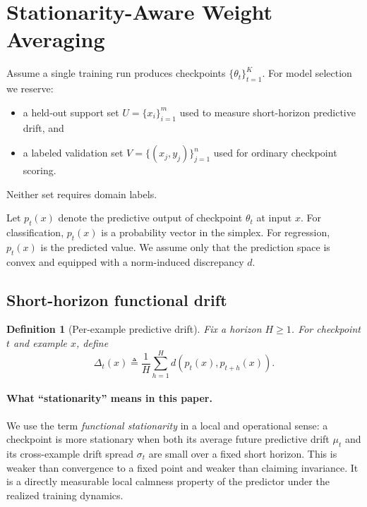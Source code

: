 \documentclass{article}
\newtheorem{definition}{Definition}
\begin{document}
\section{Stationarity-Aware Weight Averaging}
\label{sec:method}

Assume a single training run produces checkpoints $\{\theta_t\}_{t=1}^{K}$. For model selection we reserve:
\begin{itemize}[leftmargin=1.4em]
    \item a held-out support set $U = \{x_i\}_{i=1}^{m}$ used to measure short-horizon predictive drift, and
    \item a labeled validation set $V = \{(x_j,y_j)\}_{j=1}^{n}$ used for ordinary checkpoint scoring.
\end{itemize}
Neither set requires domain labels.

Let $p_t(x)$ denote the predictive output of checkpoint $\theta_t$ at input $x$. For classification, $p_t(x)$ is a probability vector in the simplex. For regression, $p_t(x)$ is the predicted value. We assume only that the prediction space is convex and equipped with a norm-induced discrepancy $d$.

\subsection{Short-horizon functional drift}

\begin{definition}[Per-example predictive drift]
Fix a horizon $H \ge 1$. For checkpoint $t$ and example $x$, define
\begin{equation}
    \Delta_t(x)
    \triangleq
    \frac{1}{H}\sum_{h=1}^{H} d\!\left(p_t(x), p_{t+h}(x)\right).
    \label{eq:delta}
\end{equation}
\end{definition}

\paragraph{What ``stationarity'' means in this paper.}
We use the term \emph{functional stationarity} in a local and operational sense: a checkpoint is more stationary when both its average future predictive drift $\mu_t$ and its cross-example drift spread $\sigma_t$ are small over a fixed short horizon. This is weaker than convergence to a fixed point and weaker than claiming invariance. It is a directly measurable local calmness property of the predictor under the realized training dynamics.
\end{document}

